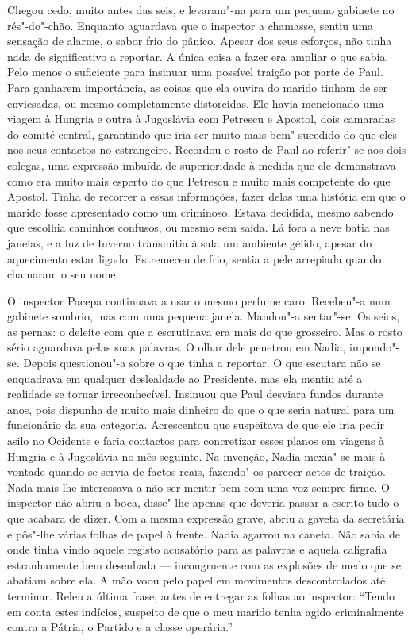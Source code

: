 Chegou cedo, muito antes das seis, e levaram"-na para um pequeno gabinete
no rés"-do"-chão. Enquanto aguardava que o inspector a chamasse, sentiu
uma sensação de alarme, o sabor frio do pânico. Apesar dos seus
esforços, não tinha nada de significativo a reportar. A única coisa a
fazer era ampliar o que sabia. Pelo menos o suficiente para insinuar uma
possível traição por parte de Paul. Para ganharem importância, as coisas
que ela ouvira do marido tinham de ser enviesadas, ou mesmo
completamente distorcidas. Ele havia mencionado uma viagem à Hungria e
outra à Jugoslávia com Petrescu e Apostol, dois camaradas do comité
central, garantindo que iria ser muito mais
bem"-sucedido do que eles nos seus contactos no estrangeiro. Recordou o
rosto de Paul ao referir"-se aos dois colegas, uma expressão imbuída de
superioridade à medida que ele demonstrava como era muito mais esperto
do que Petrescu e muito mais competente do que Apostol. Tinha de
recorrer a essas informações, fazer delas uma história em que o marido
fosse apresentado como um criminoso. Estava decidida, mesmo sabendo que
escolhia caminhos confusos, ou mesmo sem saída. Lá fora a neve batia nas
janelas, e a luz de Inverno transmitia à sala um ambiente gélido, apesar
do aquecimento estar ligado. Estremeceu de frio, sentia a pele arrepiada
quando chamaram o seu nome.

O inspector Pacepa continuava a usar o mesmo perfume caro. Recebeu"-a num gabinete sombrio, mas com uma pequena janela.
Mandou"-a sentar"-se. Os seios, as pernas: o deleite com que a escrutinava
era mais do que grosseiro. Mas o rosto sério aguardava pelas suas
palavras. O olhar dele penetrou em Nadia, impondo"-se. Depois
questionou"-a sobre o que tinha a reportar. O que escutara não se
enquadrava em qualquer deslealdade ao Presidente, mas ela mentiu até a
realidade se tornar irreconhecível. Insinuou que Paul desviara fundos
durante anos, pois dispunha de muito mais dinheiro do que o que seria
natural para um funcionário da sua categoria. Acrescentou que
suspeitava de que ele iria pedir asilo no Ocidente e faria contactos
para concretizar esses planos em viagens à Hungria e à Jugoslávia no
mês seguinte. Na invenção, Nadia mexia"-se mais à vontade quando se
servia de factos reais, fazendo"-os parecer actos de traição. Nada mais
lhe interessava a não ser mentir bem com uma voz sempre firme. O inspector não
abriu a boca, disse"-lhe apenas que deveria passar a escrito tudo o que
acabara de dizer. Com a mesma expressão grave, abriu a gaveta da
secretária e pôs"-lhe várias folhas de papel à frente. Nadia agarrou na
caneta. Não sabia de onde tinha vindo aquele registo acusatório para as
palavras e aquela caligrafia estranhamente bem desenhada ---
incongruente com as explosões de medo que se abatiam sobre ela. A mão
voou pelo papel em movimentos descontrolados até terminar. Releu a
última frase, antes de entregar as folhas ao inspector:
``Tendo em conta estes indícios, suspeito de que o meu marido tenha agido
criminalmente contra a Pátria, o Partido e a classe operária.''

